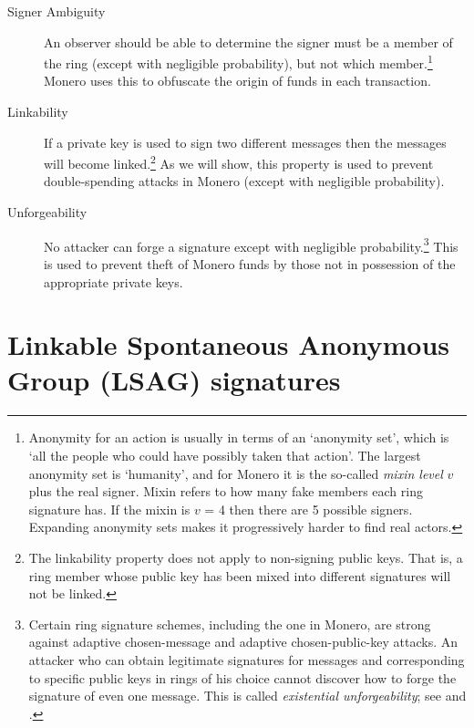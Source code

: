 \begin{description}
	
	\item[Signer Ambiguity]
	An observer should be able to determine the signer must be a member of the ring (except with negligible probability), but not which member.\footnote{\label{anonymity_note}Anonymity for an action is usually in terms of an `anonymity set’, which is `all the people who could have possibly taken that action’. The largest anonymity set is `humanity’, and for Monero it is the so-called {\em mixin level} $v$ plus the real signer. Mixin refers to how many fake members each ring signature has. If the mixin is $v$ = 4 then there are 5 possible signers. Expanding anonymity sets makes it progressively harder to find real actors.} Monero uses this to obfuscate the origin of funds in each transaction.
		
	\item[Linkability] 
	If a private key is used to sign two different messages then the messages will become linked.\footnote{\label{linkability_note}The linkability property does not apply to non-signing public keys. That is, a ring member whose public key has been mixed into different signatures will not be linked.} As we will show, this property is used to prevent double-spending attacks in Monero (except with negligible probability).
	 
	\item[Unforgeability]
    No attacker can forge a signature except with negligible probability.\footnote{\label{unforgeability_note}Certain ring signature schemes, including the one in Monero, are strong against adaptive chosen-message and adaptive chosen-public-key attacks. An attacker who can obtain legitimate signatures for messages and corresponding to specific public keys in rings of his choice cannot discover how to forge the signature of even one message. This is called {\em existential unforgeability}; see \cite{MRL-0005} and \cite{Liu2004}.} This is used to prevent theft of Monero funds by those not in possession of the appropriate private keys.
	
\end{description}




\section{Linkable Spontaneous Anonymous Group (LSAG) signatures}
\label{LSAG_section}

